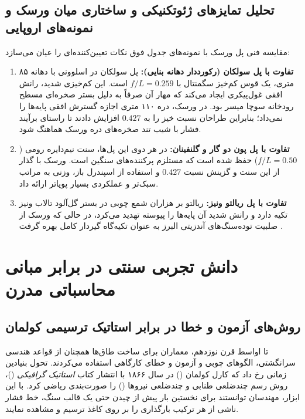 \subsection{تحلیل تمایزهای ژئوتکنیکی و ساختاری میان ورسک و نمونه‌های اروپایی}
\label{subsec:ch2_structural_differences}
مقایسه فنی پل ورسک با نمونه‌های جدول فوق نکات تعیین‌کننده‌ای را عیان می‌سازد:
\begin{enumerate}
    \item \textbf{تفاوت با پل سولکان (رکورددار دهانه بنایی):} پل سولکان در اسلوونی با دهانه ۸۵ متری، یک قوس کم‌خیز سگمنتال با $f/L = 0.259$ است. این کم‌خیزی شدید، رانش افقی غول‌پیکری ایجاد می‌کند که مهار آن صرفاً به دلیل بستر صخره‌ای مسطح رودخانه سوچا میسر بود. در ورسک، دره ۱۱۰ متری اجازه گسترش افقی پایه‌ها را نمی‌داد؛ بنابراین طراحان نسبت خیز را به $0.427$ افزایش دادند تا راستای برآیند فشار با شیب تند صخره‌های دره ورسک هماهنگ شود.
    \item \textbf{تفاوت با پل پون دو گار و گلنفینان:} در هر دوی این پل‌ها، سنت نیم‌دایره رومی ($f/L = 0.50$) حفظ شده است که مستلزم پرکننده‌های سنگین است. ورسک با گذار از این سنت و گزینش نسبت $0.427$ و استفاده از اسپندرل باز، وزنی به مراتب سبک‌تر و عملکردی بسیار پویاتر ارائه داد.
    \item \textbf{تفاوت با پل ریالتو ونیز:} ریالتو بر هزاران شمع چوبی در بستر گل‌آلود تالاب ونیز تکیه دارد و رانش شدید آن پایه‌ها را پیوسته تهدید می‌کرد، در حالی که ورسک از صلبیت توده‌سنگ‌های آندزیتی البرز به عنوان تکیه‌گاه گیردار کامل بهره گرفت \cite{attari2012seismic}.
\end{enumerate}

\section{دانش تجربی سنتی در برابر مبانی محاسباتی مدرن}
\label{sec:ch2_empirical_vs_analytical}

\subsection{روش‌های آزمون و خطا در برابر استاتیک ترسیمی کولمان}
\label{subsec:ch2_culmann_graphical_statics}
تا اواسط قرن نوزدهم، معماران برای ساخت طاق‌ها همچنان از قواعد هندسی سرانگشتی، الگوهای چوبی و آزمون و خطای کارگاهی استفاده می‌کردند. تحول بنیادین زمانی رخ داد که کارل کولمان () در سال ۱۸۶۶ با انتشار کتاب \textit{استاتیک گرافیکی} ()، روش رسم چندضلعی طنابی و چندضلعی نیروها () را صورت‌بندی ریاضی کرد. با این ابزار، مهندسان توانستند برای نخستین بار پیش از چیدن حتی یک قالب سنگ، خط فشار ناشی از هر ترکیب بارگذاری را بر روی کاغذ ترسیم و مشاهده نمایند.

